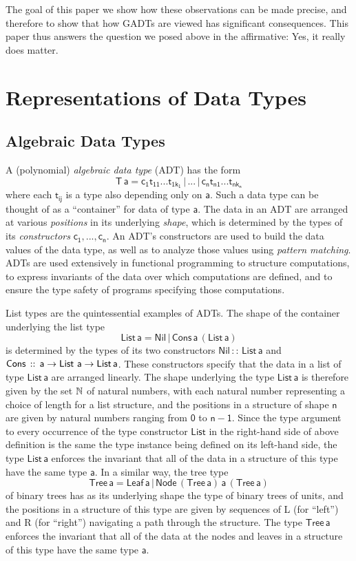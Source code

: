 \documentclass[acmsmall,screen,review,anonymous]{acmart}
\theoremstyle{definition}
\begin{document}
The goal of this paper we show how these observations can be made
precise, and therefore to show that how GADTs are viewed has
significant consequences. This paper thus answers the question we
posed above in the affirmative: Yes, it really does matter.

\section{Representations of Data Types}\label{sec:reps}

\subsection{Algebraic Data Types}\label{sec:adts}

A (polynomial) {\em algebraic data type} (ADT) has the form
\[\mathsf{T\,a} = \mathsf{c_1 t_{11}}...\mathsf{t_{1k_1}}\, |\, ...\, |\,
\mathsf{c_n t_{n1}}...\mathsf{t_{nk_n}}\] where each $\mathsf{t_{ij}}$
is a type also depending only on $\mathsf{a}$. Such a data type can be
thought of as a ``container'' for data of type $\mathsf{a}$. The data
in an ADT are arranged at various {\em positions} in its underlying
{\em shape}, which is determined by the types of its {\em
  constructors} $\mathsf{c_1},...,\mathsf{c_n}$. An ADT's constructors
are used to build the data values of the data type, as well as to
analyze those values using {\em pattern matching}. ADTs are used
extensively in functional programming to structure computations, to
express invariants of the data over which computations are defined,
and to ensure the type safety of programs specifying those
computations.

List types are the quintessential examples of ADTs. The shape of the
container underlying the list type
\[\mathsf{List\,a} = \mathsf{Nil} \,|\, \mathsf{Cons\,a\,(List\,a)}\]
is determined by the types of its two constructors $\mathsf{Nil\, ::\,
  List\, a}$ and $\mathsf{Cons \,::\,a \to \mathsf{List}\,\,a\to
  List\,a}$. These constructors specify that the data in a list of
type $\mathsf{List\,a}$ are arranged linearly. The shape underlying
the type $\mathsf{List\,a}$ is therefore given by the set $\mathbb{N}$ of
natural numbers, with each natural number representing a choice of
length for a list structure, and the positions in a structure of shape
$\mathsf{n}$ are given by natural numbers ranging from $\mathsf{0}$ to
$\mathsf{n-1}$. Since the type argument to every occurrence of the
type constructor $\mathsf{List}$ in the right-hand side of above
definition is the same the type instance being defined on its
left-hand side, the type $\mathsf{List\,a}$ enforces the invariant
that all of the data in a structure of this type have the same type
$\mathsf{a}$. In a similar way, the tree type
\[\mathsf{Tree\, a} = \mathsf{Leaf\,a}
\,|\,\mathsf{Node\,(Tree\,a)\,a\,(Tree\,a)}\] of binary trees has as
its underlying shape the type of binary trees of units, and the
positions in a structure of this type are given by sequences of L (for
``left'') and R (for ``right'') navigating a path through the
structure. The type $\mathsf{Tree\, a}$ enforces the invariant that
all of the data at the nodes and leaves in a structure of this type
have the same type $\mathsf{a}$.
\end{document}
